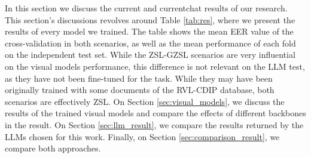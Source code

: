In this section we discuss the current and currentchat results of our research. This section's discussions revolves around Table \ref{tab:res}, where we present the results of every model we trained. The table shows the mean EER value of the cross-validation in both scenarios, as well as the mean performance of each fold on the independent test set. While the ZSL-GZSL scenarios are very influential on the visual models performance, this difference is not relevant on the \gls{LLM} test, as they have not been fine-tuned for the task. While they may have been originally trained with some documents of the RVL-CDIP database, both scenarios are effectively \gls{ZSL}. On Section \ref{sec:visual_models}, we discuss the results of the trained visual models and compare the effects of different backbones in the result. On Section \ref{sec:llm_result}, we compare the results returned by the \glspl{LLM} chosen for this work. Finally, on Section \ref{sec:comparison_result}, we compare both approaches.

